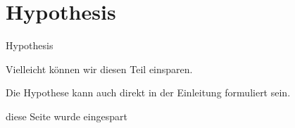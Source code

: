 \chapter{Hypothesis}
\label{cha:Hypothesis}
Hypothesis

Vielleicht können wir diesen Teil einsparen.

Die Hypothese kann auch direkt in der Einleitung formuliert sein.

diese Seite wurde eingespart 



